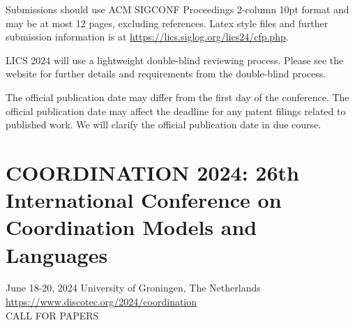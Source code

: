 \documentclass[prodmode,acmtecs]{acmsmall} %
\begin{document}
\begin{itemize}
  Submissions should use ACM SIGCONF Proceedings 2-column 10pt format and may be at most 12 pages, excluding references. Latex style files and further submission information is at \href{https://lics.siglog.org/lics24/cfp.php}{https://lics.siglog.org/lics24/cfp.php}.  
 
  LICS 2024 will use a lightweight double-blind reviewing process. Please see the website for further details and requirements from the double-blind process. 
 
  The official publication date may differ from the first day of the conference. The official publication date may affect the deadline for any patent filings related to published work. We will clarify the official publication date in due course. 
 
\end{itemize}\section{COORDINATION 2024: 26th International Conference on Coordination Models and Languages}\label{COORDINATION2024}  June 18-20, 2024 University of Groningen, The Netherlands\\ 
  \href{https://www.discotec.org/2024/coordination}{https://www.discotec.org/2024/coordination}\\ 
CALL FOR PAPERS 
\end{document}
